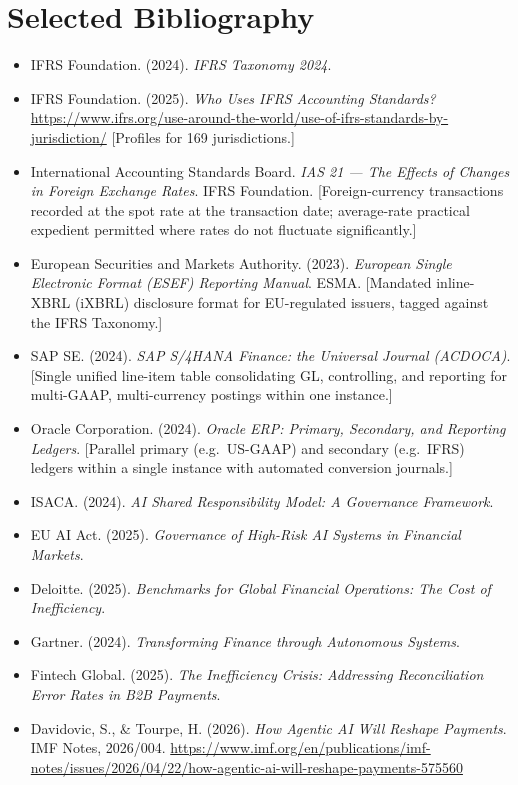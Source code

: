 \documentclass[12pt]{clapps}  %
\begin{document}
\section*{Selected Bibliography}
\begin{itemize}
    \item IFRS Foundation. (2024). \textit{IFRS Taxonomy 2024}.
    \item IFRS Foundation. (2025). \textit{Who Uses IFRS Accounting Standards?} \url{https://www.ifrs.org/use-around-the-world/use-of-ifrs-standards-by-jurisdiction/} [Profiles for 169 jurisdictions.]
    \item International Accounting Standards Board. \textit{IAS 21 --- The Effects of Changes in Foreign Exchange Rates}. IFRS Foundation. [Foreign-currency transactions recorded at the spot rate at the transaction date; average-rate practical expedient permitted where rates do not fluctuate significantly.]
    \item European Securities and Markets Authority. (2023). \textit{European Single Electronic Format (ESEF) Reporting Manual}. ESMA. [Mandated inline-XBRL (iXBRL) disclosure format for EU-regulated issuers, tagged against the IFRS Taxonomy.]
    \item SAP SE. (2024). \textit{SAP S/4HANA Finance: the Universal Journal (ACDOCA)}. [Single unified line-item table consolidating GL, controlling, and reporting for multi-GAAP, multi-currency postings within one instance.]
    \item Oracle Corporation. (2024). \textit{Oracle ERP: Primary, Secondary, and Reporting Ledgers}. [Parallel primary (e.g.\ US-GAAP) and secondary (e.g.\ IFRS) ledgers within a single instance with automated conversion journals.]
    \item ISACA. (2024). \textit{AI Shared Responsibility Model: A Governance Framework}.
    \item EU AI Act. (2025). \textit{Governance of High-Risk AI Systems in Financial Markets}.
    \item Deloitte. (2025). \textit{Benchmarks for Global Financial Operations: The Cost of Inefficiency}.
    \item Gartner. (2024). \textit{Transforming Finance through Autonomous Systems}.
    \item Fintech Global. (2025). \textit{The Inefficiency Crisis: Addressing Reconciliation Error Rates in B2B Payments}.
    \item Davidovic, S., \& Tourpe, H. (2026). \textit{How Agentic AI Will Reshape Payments}. IMF Notes, 2026/004. \url{https://www.imf.org/en/publications/imf-notes/issues/2026/04/22/how-agentic-ai-will-reshape-payments-575560}

\end{itemize}
\end{document}
